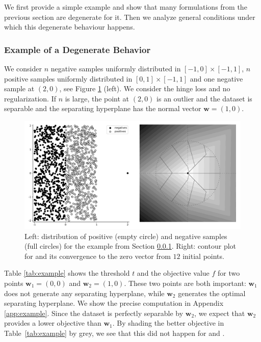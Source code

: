 We first provide a simple example and show that many formulations from the previous section are degenerate for it. Then we analyze general conditions under which this degenerate behaviour happens.

\subsubsection{Example of a Degenerate Behavior}\label{sec:example}

We consider $n$ negative samples uniformly distributed in $[-1,0]\times[-1,1]$, $n$ positive samples uniformly distributed in $[0,1]\times[-1,1]$ and one negative sample at $(2,0)$, see Figure \ref{fig:example} (left). We consider the hinge loss and no regularization. If $n$ is large, the point at $(2,0)$ is an outlier and the dataset is separable and the separating hyperplane has the normal vector $\bm{w}=(1,0)$. 

\begin{figure}[!ht]
  \centering
  \includegraphics[width=0.7\linewidth]{data/toppush_convergence.pdf}
  \caption{Left: distribution of positive (empty circle) and negative samples (full circles) for the example from Section \ref{sec:example}. Right: contour plot for \TopPush and its convergence to the zero vector from $12$ initial points.}
  \label{fig:example}
\end{figure}

Table \ref{tab:example} shows the threshold $t$ and the objective value $f$ for two points $\bm{w}_1=(0,0)$ and $\bm{w}_2=(1,0)$. These two points are both important: $\bm{w}_1$ does not generate any separating hyperplane, while $\bm{w}_2$ generates the optimal separating hyperplane. We show the precise computation in Appendix \ref{app:example}. Since the dataset is perfectly separable by $\bm{w}_2$, we expect that $\bm{w}_2$ provides a lower objective than $\bm{w}_1$. By shading the better objective in Table~\ref{tab:example} by grey, we see that this did not happen for \TopPush and \TopMeanK.


